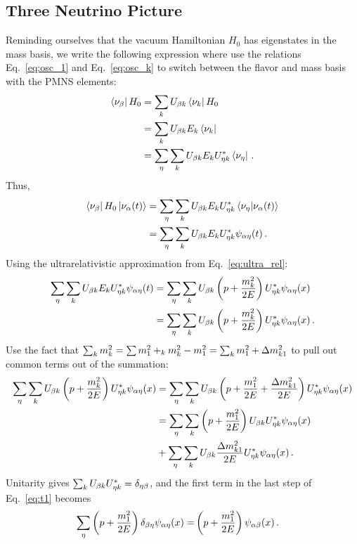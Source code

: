 \subsection{Three Neutrino Picture}
Reminding ourselves that the vacuum Hamiltonian $H_0$ has eigenstates in the mass basis, we write the following expression where 
use the relations Eq.~\ref{eq:osc_1} and Eq.~\ref{eq:osc_k} to switch between the flavor and mass basis with the PMNS elements:
\begin{align}
    \bra{\nu_\beta} H_0 &= \sum_k U_{\beta k} \bra{\nu_k}H_0 \nonumber \\
                     &= \sum_k U_{\beta k} E_k \bra{\nu_k} \nonumber \\
                     &= \sum_\eta \sum_k U_{\beta k} E_k U^*_{\eta k} \bra{\nu_\eta}\,.
\end{align}
Thus,
\begin{align}
    \bra{\nu_\beta}H_0\ket{\nu_\alpha (t)} &= \sum_\eta \sum_k U_{\beta k} E_k U^*_{\eta k} \bra{\nu_\eta}\ket{\nu_\alpha (t)} \nonumber \\
                                    &= \sum_\eta \sum_k U_{\beta k} E_k U^*_{\eta k} \psi_{\alpha\eta}(t)\,.
\end{align}
Using the ultrarelativistic approximation from Eq.~\ref{eq:ultra_rel}:
\begin{align}
    \sum_\eta \sum_k U_{\beta k} E_k U^*_{\eta k} \psi_{\alpha\eta}(t) &= \sum_\eta \sum_k U_{\beta k} \left(p + \frac{m^2_k}{2E}\right) U^*_{\eta k} \psi_{\alpha\eta}(x) \nonumber \\
    &= \sum_\eta \sum_k U_{\beta k} \left(p + \frac{m^2_k}{2E}\right) U^*_{\eta k} \psi_{\alpha\eta}(x)\,.
\end{align}
Use the fact that $\sum_k m_k^2 =  \sum m_1^2 +_k m^2_k - m^2_1 =\sum_k m_1^2 +  \dm_{k1}$ to pull out common terms out of the summation:
\begin{align}\label{eq:t1}
    \sum_\eta \sum_k U_{\b k} \left(p + \frac{m^2_k}{2E}\right) U^*_{\eta k} \psi_{\a\eta}(x) &= \sum_\eta \sum_k U_{\b k} \left(p + \frac{m^2_1}{2E} + \frac{\dm_{k1}}{2E}\right) U^*_{\eta k} \psi_{\a\eta}(x) \nonumber \\
    &= \sum_\eta\sum_k \left(p + \frac{m^2_1}{2E}\right) U_{\b k} U^*_{\eta k} \psi_{\a\eta}(x) \nonumber \\
    &+ \sum_\eta\sum_k U_{\b k} \frac{\dm_{k1}}{2E} U^*_{\eta k} \psi_{\a\eta}(x)\,.
\end{align}
Unitarity gives $ \sum_k U_{\beta k} U^*_{\eta k} = \delta_{\eta\beta}$, and the first term in the last step of Eq.~\ref{eq:t1} becomes
\begin{align}
    \sum_\eta \left(p + \frac{m^2_1}{2E}\right) \delta_{\beta \eta} \psi_{\alpha\eta}(x)
    =& \left(p + \frac{m^2_1}{2E}\right) \psi_{\alpha\beta}(x)\,.
\end{align}


